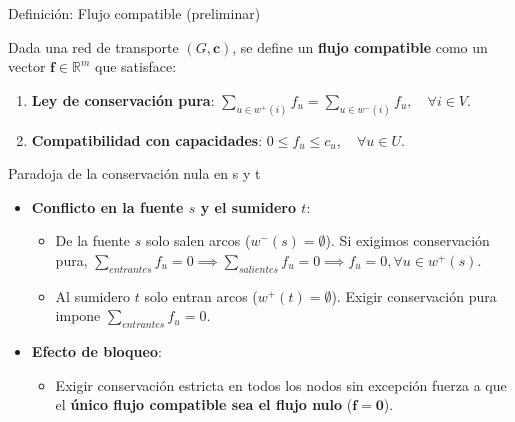 \documentclass[
  ignorenonframetext,
]{beamer}
\providecommand{\tightlist}{%
  \setlength{\itemsep}{0pt}\setlength{\parskip}{0pt}}
\begin{document}
\begin{frame}{Definición: Flujo compatible (preliminar)}
\label{definiciuxf3n-flujo-compatible-preliminar}
\begin{tcolorbox}[enhanced jigsaw, opacityback=0, breakable, title=\textcolor{quarto-callout-note-color}{\faInfo}\hspace{0.5em}{Flujo compatible (versión preliminar)}, colback=white, colbacktitle=quarto-callout-note-color!10!white, bottomrule=.15mm, opacitybacktitle=0.6, coltitle=black, bottomtitle=1mm, leftrule=.75mm, colframe=quarto-callout-note-color-frame, toptitle=1mm, titlerule=0mm, rightrule=.15mm, left=2mm, arc=.35mm, toprule=.15mm]

Dada una red de transporte \((G, \mathbf{c})\), se define un
\textbf{flujo compatible} como un vector \(\mathbf{f} \in \mathbb{R}^m\)
que satisface:

\begin{enumerate}
\tightlist
\item
  \textbf{Ley de conservación pura}:
  \(\sum_{u \in w^+(i)} f_u = \sum_{u \in w^-(i)} f_u, \quad \forall i \in V\).
\item
  \textbf{Compatibilidad con capacidades}:
  \(0 \le f_u \le c_u, \quad \forall u \in U\).
\end{enumerate}

\end{tcolorbox}
\end{frame}

\begin{frame}{Paradoja de la conservación nula en s y t}
\label{paradoja-de-la-conservaciuxf3n-nula-en-s-y-t}
\begin{itemize}
\tightlist
\item
  \textbf{Conflicto en la fuente \(s\) y el sumidero \(t\)}:

  \begin{itemize}
  \tightlist
  \item
    De la fuente \(s\) solo salen arcos (\(w^-(s) = \emptyset\)). Si
    exigimos conservación pura,
    \(\sum_{entrantes} f_u = 0 \implies \sum_{salientes} f_u = 0 \implies f_u = 0, \forall u \in w^+(s)\).
  \item
    Al sumidero \(t\) solo entran arcos (\(w^+(t) = \emptyset\)). Exigir
    conservación pura impone \(\sum_{entrantes} f_u = 0\).
  \end{itemize}
\item
  \textbf{Efecto de bloqueo}:

  \begin{itemize}
  \tightlist
  \item
    Exigir conservación estricta en todos los nodos sin excepción fuerza
    a que el \textbf{único flujo compatible sea el flujo nulo}
    (\(\mathbf{f} = \mathbf{0}\)).
  \end{itemize}
\end{itemize}
\end{frame}
\end{document}
